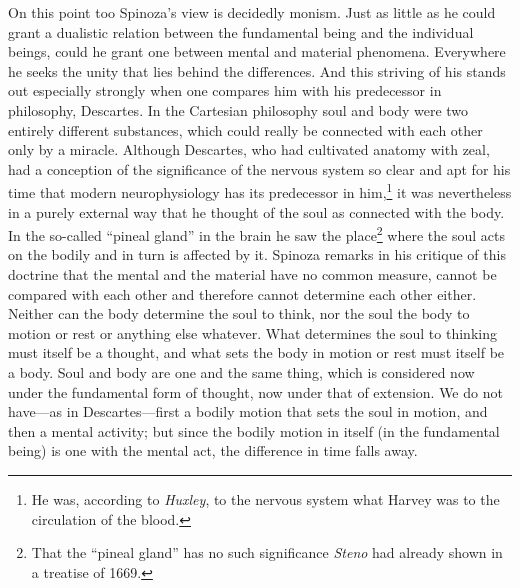 \documentclass[12pt]{book}
\newcommand{\opage}[1]{\marginnote{\footnotesize\textit{[#1]}}}
\begin{document}
On this point too Spinoza's view is decidedly monism. Just as little as he could grant
a dualistic relation between the fundamental being and the individual beings, could he
grant one between mental and material phenomena. Everywhere he seeks the unity that
lies behind the differences. And this striving of his stands out especially strongly
when one compares him with his predecessor in philosophy, Descartes. In the Cartesian
philosophy soul and body were two entirely different substances, which could really be
connected with each other only by a miracle. Although Descartes, who had cultivated
anatomy with zeal, had a conception of the significance of the nervous system so clear
and apt for his time that modern neurophysiology has its predecessor in
him,\footnote{He was, according to \emph{Huxley}, to the nervous system what Harvey was
to the circulation of the blood.} it was nevertheless in a purely external way that he
thought of the soul as connected with the body. In the so-called ``pineal gland'' in the
brain he saw the place\footnote{That the ``pineal gland'' has no such significance
\emph{Steno} had already shown in a treatise of 1669.} where the soul acts on the
bodily and in turn is affected by it. Spinoza remarks in his critique of this doctrine
that the mental and the material have no common measure, cannot \opage{95}be compared
with each other and therefore cannot determine each other either. Neither can the body
determine the soul to think, nor the soul the body to motion or rest or anything else
whatever. What determines the soul to thinking must itself be a thought, and what sets
the body in motion or rest must itself be a body. Soul and body are one and the same
thing, which is considered now under the fundamental form of thought, now under that of
extension. We do not have---as in Descartes---first a bodily motion that sets the soul
in motion, and then a mental activity; but since the bodily motion in itself (in the
fundamental being) is one with the mental act, the difference in time falls away.
\end{document}
